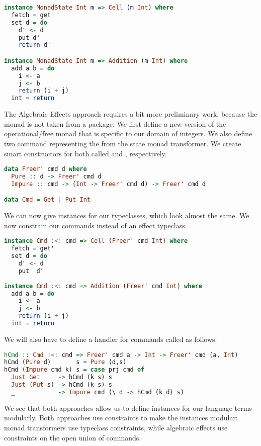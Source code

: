 \begin{lstlisting}[language=Haskell]
instance MonadState Int m => Cell (m Int) where
  fetch = get
  set d = do
    d' <- d
    put d'
    return d'

instance MonadState Int m => Addition (m Int) where
  add a b = do
    i <- a
    j <- b
    return (i + j)
  int = return
\end{lstlisting}

The Algebraic Effects approach requires a bit more preliminary work, because the monad is not taken from a package. We first define a new version of the operational/free monad that is specific to our domain of integers. We also define two command representing the  from the state monad transformer. We create smart constructors for both called  and , respectively.

\begin{lstlisting}[language=Haskell]
data Freer' cmd d where
  Pure :: d -> Freer' cmd d
  Impure :: cmd -> (Int -> Freer' cmd d) -> Freer' cmd d

data Cmd = Get | Put Int
\end{lstlisting}

We can now give instances for our typeclasses, which look almost the same. We now constrain our commands instead of an effect typeclass.

\begin{lstlisting}[language=Haskell]
instance Cmd :<: cmd => Cell (Freer' cmd Int) where
  fetch = get'
  set d = do
    d' <- d
    put' d'
    
instance Cmd :<: cmd => Addition (Freer' cmd Int) where
  add a b = do
    i <- a
    j <- b
    return (i + j)
  int = return
\end{lstlisting}

We will also have to define a handler for  commands called  as follows.

\begin{lstlisting}[language=Haskell]
hCmd :: Cmd :<: cmd => Freer' cmd a -> Int -> Freer' cmd (a, Int)
hCmd (Pure d)       s = Pure (d,s)
hCmd (Impure cmd k) s = case prj cmd of
  Just Get     -> hCmd (k s) s
  Just (Put s) -> hCmd (k s) s
  _            -> Impure cmd (\ d -> hCmd (k d) s)
\end{lstlisting}

We see that both approaches allow us to define instances for our language terms modularly. Both approaches use constraints to make the instances modular: monad transformers use typeclass constraints, while algebraic effects use constraints on the open union of commands.


